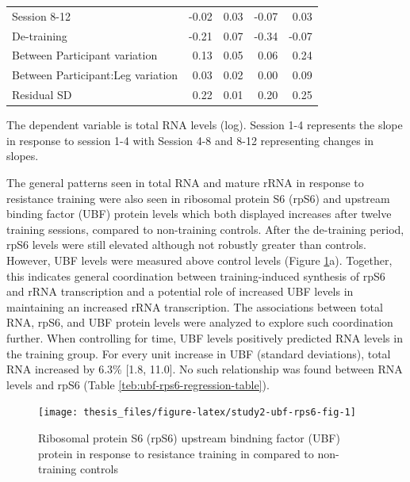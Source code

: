 \documentclass[twoside,10pt]{gihclass} %
\begin{document}
\begin{table}
\begin{threeparttable}
\begin{tabular}[t]{lrrrr}
\hspace{1em}Session 8-12 & -0.02 & 0.03 & -0.07 & 0.03\\
\hspace{1em}De-training & -0.21 & 0.07 & -0.34 & -0.07\\
\hspace{1em}Between Participant variation & 0.13 & 0.05 & 0.06 & 0.24\\
\hspace{1em}Between Participant:Leg variation & 0.03 & 0.02 & 0.00 & 0.09\\
\hspace{1em}Residual SD & 0.22 & 0.01 & 0.20 & 0.25\\
\bottomrule
\end{tabular}
\begin{tablenotes}[para]
\item The dependent variable is total RNA levels (log). Session 1-4 represents the slope in response to session 1-4 with Session 4-8 and 8-12 representing changes in slopes.
\end{tablenotes}
\end{threeparttable}
\end{table}
The general patterns seen in total RNA and mature rRNA in response to resistance training were also seen in ribosomal protein S6 (rpS6) and upstream binding factor (UBF) protein levels which both displayed increases after twelve training sessions, compared to non-training controls. After the de-training period, rpS6 levels were still elevated although not robustly greater than controls. However, UBF levels were measured above control levels
(Figure \ref{fig:study2-ubf-rps6-fig}a).
Together, this indicates general coordination between training-induced synthesis of rpS6 and rRNA transcription and a potential role of increased UBF levels in maintaining an increased rRNA transcription.
The associations between total RNA, rpS6, and UBF protein levels were analyzed to explore such coordination further. When controlling for time, UBF levels positively predicted RNA levels in the training group. For every unit increase in UBF (standard deviations), total RNA increased by 6.3\% {[}1.8, 11.0{]}. No such relationship was found between RNA levels and rpS6 (Table \ref{teb:ubf-rps6-regression-table}).
\begin{figure}

{\centering \texttt{[image: thesis\_files/figure-latex/study2-ubf-rps6-fig-1]} 

}

\caption[UBF and rpS6 protein in resposne to resistance training in Study II.]{Ribosomal protein S6 (rpS6) upstream bindning factor (UBF) protein in response to resistance training in compared to non-training controls}\label{fig:study2-ubf-rps6-fig}
\end{figure}
\end{document}

